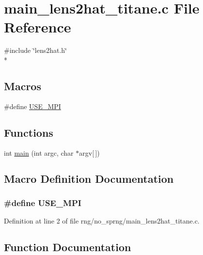 \section{main\-\_\-lens2hat\-\_\-titane.\-c File Reference}
\label{rng_2no__sprng_2main__lens2hat__titane_8c}
{\ttfamily \#include \char`\"{}lens2hat.\-h\char`\"{}}\\*
\subsection*{Macros}
\begin{DoxyCompactItemize}
\item 
\#define \hyperlink{rng_2no__sprng_2main__lens2hat__titane_8c_a3869d282031f6ea6b50fdb980b758420}{U\-S\-E\-\_\-\-M\-P\-I}
\end{DoxyCompactItemize}
\subsection*{Functions}
\begin{DoxyCompactItemize}
\item 
int \hyperlink{rng_2no__sprng_2main__lens2hat__titane_8c_a0ddf1224851353fc92bfbff6f499fa97}{main} (int argc, char $\ast$argv\mbox{[}$\,$\mbox{]})
\end{DoxyCompactItemize}


\subsection{Macro Definition Documentation}
\subsubsection[{U\-S\-E\-\_\-\-M\-P\-I}]{\setlength{\rightskip}{0pt plus 5cm}\#define U\-S\-E\-\_\-\-M\-P\-I}\label{rng_2no__sprng_2main__lens2hat__titane_8c_a3869d282031f6ea6b50fdb980b758420}


Definition at line 2 of file rng/no\-\_\-sprng/main\-\_\-lens2hat\-\_\-titane.\-c.



\subsection{Function Documentation}
